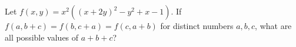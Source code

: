 Let $f\left(x,y\right)=x^2\left(\left(x+2y\right)^2-y^2+x-1\right)$. If $f\left(a,b+c\right)=f\left(b,c+a\right)=f\left(c,a+b\right)$ for distinct numbers $a,b,c$, what are all possible values of $a+b+c$?
